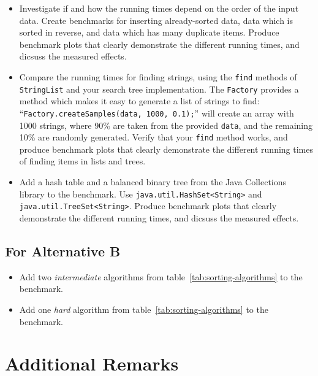\documentclass[a4paper,10pt]{article}
\begin{document}
\begin{itemize}

\item
  Investigate if and how the running times depend on the order of the input data.
  Create benchmarks for inserting already-sorted data, data which is sorted in reverse, and data which has many duplicate items.
  Produce benchmark plots that clearly demonstrate the different running times, and dicsuss the measured effects.

\item
  Compare the running times for finding strings, using the \texttt{find} methods of \texttt{StringList} and your search tree implementation.
  The \texttt{Factory} provides a method which makes it easy to generate a list of strings to find:
  ``\texttt{Factory.create\-Samples(data, 1000, 0.1);}'' will create an array with 1000 strings, where 90\% are taken from the provided \texttt{data}, and the remaining 10\% are randomly generated.
  Verify that your \texttt{find} method works, and produce benchmark plots that clearly demonstrate the different running times of finding items in lists and trees.

\item
  Add a hash table and a balanced binary tree from the Java Collections library to the benchmark.
  Use \texttt{java.util.HashSet<String>} and \texttt{java.util.TreeSet<String>}.
  Produce benchmark plots that clearly demonstrate the different running times, and dicsuss the measured effects.

\end{itemize}



\subsection*{For Alternative B}

\begin{itemize}

\item
  Add two \emph{intermediate} algorithms from table~\ref{tab:sorting-algorithms} to the benchmark.

\item
  Add one \emph{hard} algorithm from table~\ref{tab:sorting-algorithms} to the benchmark.
  
\end{itemize}



\section{Additional Remarks}\label{sec:remarks}
\end{document}

